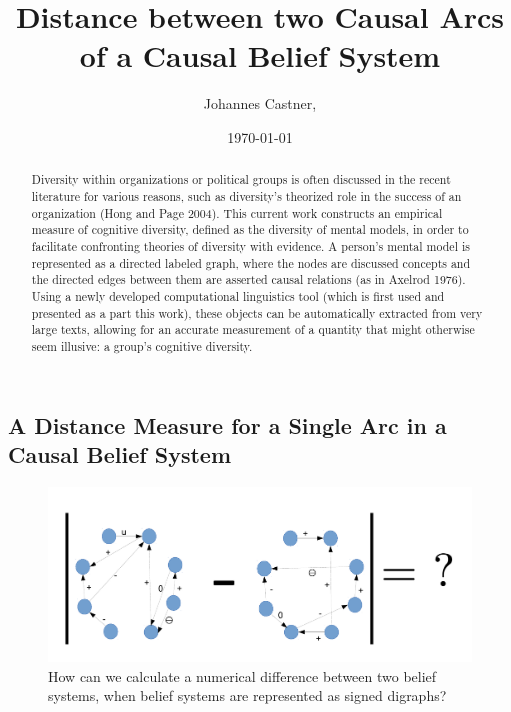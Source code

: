 \documentclass[12pt]{article}
\begin{document}
%

\title{Distance between two Causal Arcs of a Causal Belief System}			%
\author{Johannes  Castner, }		%
\date \today	
\maketitle
  \begin{abstract}
Diversity within organizations or political groups is often discussed in the recent literature for various reasons, such as diversity's theorized role in the success of an organization (Hong and Page 2004). This current work constructs an empirical measure of cognitive diversity, defined as the diversity of mental models, in order to facilitate confronting theories of diversity with evidence.  A person's mental model is represented as a directed labeled graph, where the nodes are discussed concepts and the directed edges between them are asserted causal relations (as in Axelrod 1976).  Using a newly developed computational linguistics tool (which is first used and presented as a part this work), these objects can be automatically extracted from very large texts, allowing for an accurate measurement of a quantity that might otherwise seem illusive: a group's cognitive diversity. 
  \end{abstract}

\subsection{A Distance Measure for a Single Arc in a Causal Belief System}

\begin{figure}
        \centering
      
             \includegraphics[width=\textwidth]{GraphDistance.pdf}
             \caption{How can we calculate a numerical difference between two belief systems, when belief systems are represented as signed digraphs?}
                
               \end{figure}%
   
\end{document}

